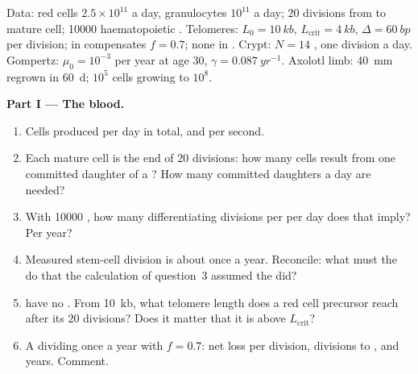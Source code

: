 \begin{problem}
\label{pb:b3:stem-cells:1}
Data: red cells $2.5\times 10^{11}$ a day, granulocytes $10^{11}$ a
day; $20$ divisions from  to mature cell; \num{10000}
haematopoietic . Telomeres: $L_{0} = \qty{10}{kb}$,
$L_{\text{crit}} = \qty{4}{kb}$, $\Delta = \qty{60}{bp}$ per division;
 in  compensates $f = 0.7$; none in .
Crypt: $N = 14$ , one division a day. Gompertz: $\mu_{0} =
10^{-3}$ per year at age 30, $\gamma = \qty{0.087}{yr^{-1}}$. Axolotl
limb: \qty{40}{mm} regrown in \qty{60}{d};  $10^{5}$ cells
growing to $10^{8}$.

\medskip
\noindent\textbf{Part I --- The blood.}
\begin{enumerate}
  \item Cells produced per day in total, and per second.
  \item Each mature cell is the end of $20$ divisions: how many cells
        result from one committed daughter of a ? How many
        committed daughters a day are needed?
  \item With \num{10000} , how many differentiating divisions
        per  per day does that imply? Per year?
  \item Measured stem-cell division is about once a year. Reconcile:
        what must the  do that the calculation of
        question~3 assumed the  did?
  \item {} have no . From \qty{10}{kb}, what telomere
        length does a red cell precursor reach after its $20$ divisions?
        Does it matter that it is above $L_{\text{crit}}$?
  \item A  dividing once a year with $f = 0.7$: net loss per
        division, divisions to , and years. Comment.
\end{enumerate}


\end{problem}
